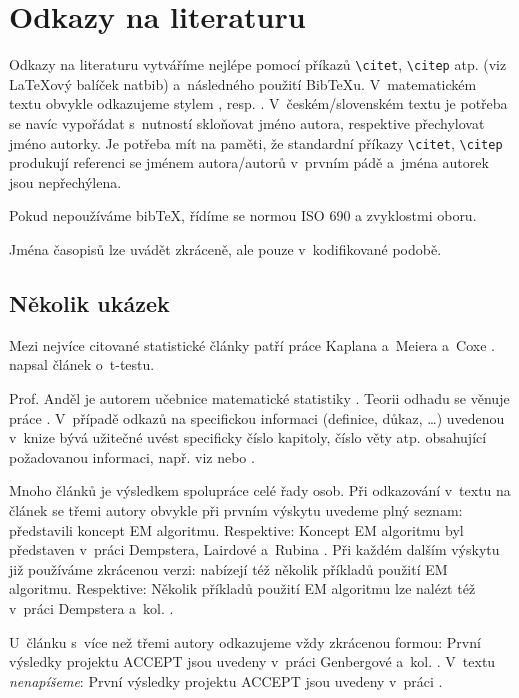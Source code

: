 
\chapter{Odkazy na literaturu}

Odkazy na literaturu vytváříme nejlépe pomocí příkazů
\verb|\citet|, \verb|\citep| atp.
(viz {\LaTeX}ový balíček \textsf{natbib}) a~následného použití
Bib{\TeX}u. V~matematickém textu obvykle odkazujeme stylem , resp. . V~českém/slovenském textu je potřeba se navíc vypořádat
s~nutností skloňovat jméno autora, respektive přechylovat jméno
autorky. Je potřeba mít na paměti, že standardní příkazy
\verb|\citet|, \verb|\citep|
produkují referenci se jménem autora/autorů v~prvním pádě a~jména
autorek jsou nepřechýlena.

Pokud nepoužíváme bib\TeX{}, řídíme se normou ISO 690 a zvyklostmi
oboru.

Jména časopisů lze uvádět zkráceně, ale pouze v~kodifikované podobě.


\section{Několik ukázek}

Mezi nejvíce citované statistické články patří práce Kaplana a~Meiera a~Coxe
\citep{KaplanMeier58, Cox72}. \citet{Student08} napsal článek o~t-testu.

Prof. Anděl je autorem učebnice matematické statistiky
\citep[viz][]{Andel98}. Teorii odhadu se věnuje práce
\citet{LehmannCasella98}. V~případě odkazů na specifickou informaci
(definice, důkaz, \dots) uvedenou v~knize bývá užitečné uvést
specificky číslo kapitoly, číslo věty atp. obsahující požadovanou
informaci, např. viz \citet[Věta 4.22]{Andel07} nebo \citep[viz][Věta
4.22]{Andel07}.

Mnoho článků je výsledkem spolupráce celé řady osob. Při odkazování
v~textu na článek se třemi autory obvykle při prvním výskytu uvedeme
plný seznam: \citet*{DempsterLairdRubin77} představili koncept EM
algoritmu. Respektive: Koncept EM algoritmu byl představen v~práci
Dempstera, Lairdové a~Rubina \citep*{DempsterLairdRubin77}. Při každém
dalším výskytu již používáme zkrácenou verzi:
\citet{DempsterLairdRubin77} nabízejí též několik příkladů použití EM
algoritmu. Respektive: Několik příkladů použití EM algoritmu lze
nalézt též v~práci Dempstera a~kol. \citep{DempsterLairdRubin77}.

U~článku s~více než třemi autory odkazujeme vždy zkrácenou formou:
První výsledky projektu ACCEPT jsou uvedeny v~práci Genbergové a~kol.
\citep{Genberget08}. V~textu \emph{nenapíšeme}: První výsledky
projektu ACCEPT jsou uvedeny v~práci \citet*{Genberget08}.
